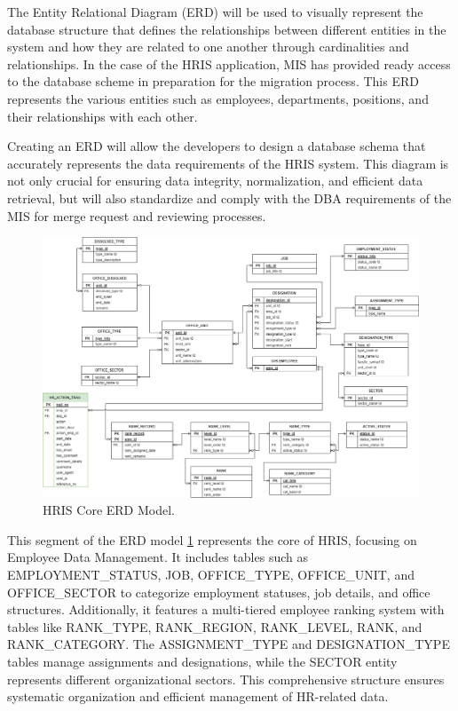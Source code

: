     The Entity Relational Diagram (ERD) will be used to visually represent the database structure that defines the relationships between different entities in the system and how they are related to one another through cardinalities and relationships. In the case of the HRIS application, MIS has provided ready access to the database scheme in preparation for the migration process. This ERD represents the various entities such as employees, departments, positions, and their relationships with each other. 
    
    Creating an ERD will allow the developers to design a database schema that accurately represents the data requirements of the HRIS system. This diagram is not only crucial for ensuring data integrity, normalization, and efficient data retrieval, but will also standardize and comply with the DBA requirements of the MIS for merge request and reviewing processes.

    \begin{figure}[H]
        \centering
        \includegraphics[width=1\linewidth]{figures/images/erd-hris.png}
        \caption{HRIS Core ERD Model.}
        \label{fig:erd-hris}
    \end{figure}

    This segment of the ERD model \ref*{fig:erd-hris} represents the core of HRIS, focusing on Employee Data Management. It includes tables such as EMPLOYMENT\_STATUS, JOB, OFFICE\_TYPE, OFFICE\_UNIT, and OFFICE\_SECTOR to categorize employment statuses, job details, and office structures. Additionally, it features a multi-tiered employee ranking system with tables like RANK\_TYPE, RANK\_REGION, RANK\_LEVEL, RANK, and RANK\_CATEGORY. The ASSIGNMENT\_TYPE and DESIGNATION\_TYPE tables manage assignments and designations, while the SECTOR entity represents different organizational sectors. This comprehensive structure ensures systematic organization and efficient management of HR-related data.
    

